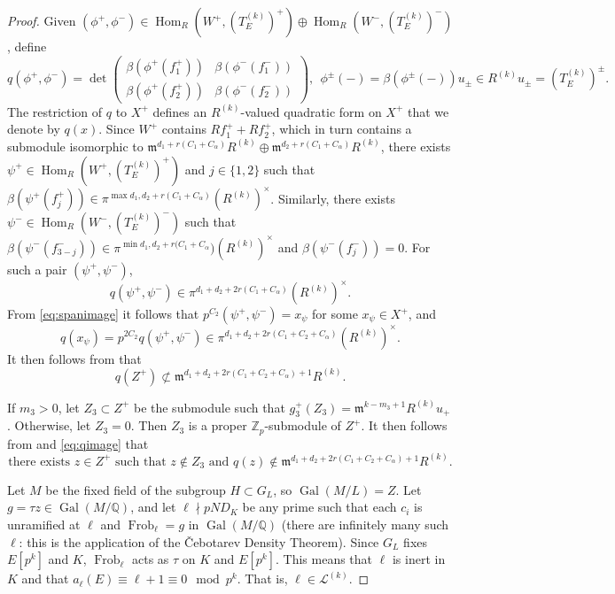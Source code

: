 \documentclass[10pt]{amsart}
\numberwithin{equation}{section}
\theoremstyle{definition}
\theoremstyle{remark}
\newcommand{\Z}{\mathbb{Z}}
\newcommand{\Q}{\mathbb{Q}}
\newcommand{\fm}{\mathfrak{m}}
\DeclareMathOperator{\Frob}{Frob}
\DeclareMathOperator{\Hom}{Hom}
\DeclareMathOperator{\Gal}{Gal}
\newcommand{\CL}{\mathscr{L}}
\begin{document}
\begin{proof}
Given $(\phi^+,\phi^-) \in \Hom_R(W^+,(T_E^{(k)})^+)\oplus \Hom_R(W^-,(T_E^{(k)})^-)$, define
$$
q(\phi^+,\phi^-) = \det\left(\begin{matrix}
\beta(\phi^+(f_1^+)) & \beta(\phi^-(f_1^-)) \\
\beta(\phi^+(f_2^+)) & \beta(\phi^-(f_2^-))
\end{matrix}\right), \ \ 
\phi^\pm(-) = \beta(\phi^\pm(-))u_{\pm}\in R^{(k)}u_\pm = (T_E^{(k)})^\pm.
$$
The restriction of $q$ to $X^+$ defines an $R^{(k)}$-valued quadratic form 
on $X^+$ that we denote by $q(x)$. 
Since $W^+$ contains $Rf_1^+ +R f_2^+$, which in turn contains
a submodule isomorphic to 
$\fm^{d_1+r(C_1+C_\alpha)}R^{(k)}\oplus \fm^{d_2+r(C_1+C_\alpha)}R^{(k)}$, there exists
$\psi^+\in \Hom_R(W^+,(T_E^{(k)})^+)$ and $j\in \{1,2\}$ such that 
$\beta(\psi^+(f_j^+)) \in \pi^{\max{d_1,d_2}+r(C_1+C_\alpha)}(R^{(k)})^\times$.
Similarly, there exists $\psi^-\in \Hom_R(W^-,(T_E^{(k)})^-)$
such that $\beta(\psi^-(f_{3-j}^-)) \in \pi^{\min{d_1,d_2}+r(C_1+C_\alpha})(R^{(k)})^\times$
and $\beta(\psi^-(f_j^-)) = 0$.
For such a pair $(\psi^+,\psi^-)$, 
$$
q(\psi^+,\psi^-) \in \pi^{d_1+d_2+2r(C_1+C_\alpha)}(R^{(k)})^\times.
$$
From \eqref{eq:spanimage} it follows that $p^{C_2}(\psi^+,\psi^-) = x_\psi$ for some $x_\psi\in X^+$, and
$$
q(x_\psi) = p^{2C_2}q(\psi^+,\psi^-) 
\in\pi^{d_1+d_2+2r(C_1+C_2+C_\alpha)}(R^{(k)})^\times.
$$
It then follows from \cite[Lem.~(6.6.1)(ii)]{nekovar} that 
\begin{equation}\label{eq:qimage}
q(Z^+) \not\subset \fm^{d_1+d_2+2r(C_1+C_2+C_\alpha)+1}R^{(k)}.
\end{equation}

If $m_3>0$, let $Z_3\subset Z^+$ be the submodule such that 
$g_3^+(Z_3) = \fm^{k-{m_3}+1}R^{(k)} u_+$. Otherwise, let $Z_3 =0$. Then $Z_3$ is a proper $\Z_p$-submodule of $Z^+$.
It then follows from \cite[Lem.~(6.6.1)(iii)]{nekovar} and \eqref{eq:qimage} that
\begin{equation}\label{eq:z}
\text{there exists $z\in Z^+$ such that $z\not\in Z_3$ and $q(z) \not\in \fm^{d_1+d_2+2r(C_1+C_2+C_\alpha)+1}R^{(k)}$.}
\end{equation}

Let $M$ be the fixed field of the subgroup $H\subset G_L$, so $\Gal(M/L) = Z$. 
Let $g = \tau z \in \Gal(M/\Q)$, and let 
$\ell\nmid pND_K$ be any prime such that each $c_i$ is unramified at $\ell$ and $\Frob_\ell = g$ in $\Gal(M/\Q)$ 
(there are infinitely many such $\ell$: this is the application of the \v{C}ebotarev Density Theorem). 
Since $G_L$ fixes $E[p^k]$ and $K$, 
$\Frob_\ell$ acts as $\tau$ on $K$ and $E[p^k]$.
This means that $\ell$ is inert in $K$ and that $a_\ell(E) \equiv \ell +1 \equiv 0 \mod p^k$. 
That is, $\ell\in \CL^{(k)}$.


\end{proof}
\end{document}
